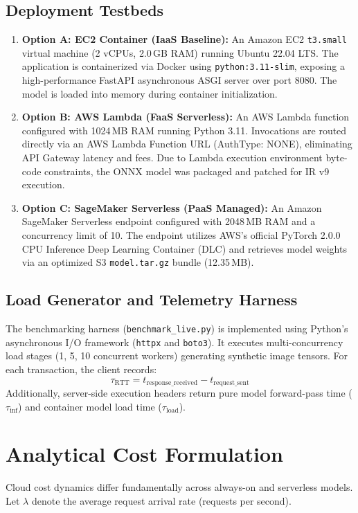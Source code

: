 \documentclass[conference]{IEEEtran}
\begin{document}
\subsection{Deployment Testbeds}
\begin{enumerate}
    \item \textbf{Option A: EC2 Container (IaaS Baseline):} An Amazon EC2 \texttt{t3.small} virtual machine (2 vCPUs, 2.0\,GB RAM) running Ubuntu 22.04 LTS. The application is containerized via Docker using \texttt{python:3.11-slim}, exposing a high-performance FastAPI asynchronous ASGI server over port 8080. The model is loaded into memory during container initialization.
    \item \textbf{Option B: AWS Lambda (FaaS Serverless):} An AWS Lambda function configured with 1024\,MB RAM running Python 3.11. Invocations are routed directly via an AWS Lambda Function URL (AuthType: NONE), eliminating API Gateway latency and fees. Due to Lambda execution environment byte-code constraints, the ONNX model was packaged and patched for IR v9 execution.
    \item \textbf{Option C: SageMaker Serverless (PaaS Managed):} An Amazon SageMaker Serverless endpoint configured with 2048\,MB RAM and a concurrency limit of 10. The endpoint utilizes AWS's official PyTorch 2.0.0 CPU Inference Deep Learning Container (DLC) and retrieves model weights via an optimized S3 \texttt{model.tar.gz} bundle (12.35\,MB).
\end{enumerate}

\subsection{Load Generator and Telemetry Harness}
The benchmarking harness (\texttt{benchmark\_live.py}) is implemented using Python's asynchronous I/O framework (\texttt{httpx} and \texttt{boto3}). It executes multi-concurrency load stages (1, 5, 10 concurrent workers) generating synthetic image tensors. For each transaction, the client records:
\begin{equation}
    \tau_{\text{RTT}} = t_{\text{response\_received}} - t_{\text{request\_sent}}
\end{equation}
Additionally, server-side execution headers return pure model forward-pass time ($\tau_{\text{inf}}$) and container model load time ($\tau_{\text{load}}$).

\section{Analytical Cost Formulation}
Cloud cost dynamics differ fundamentally across always-on and serverless models. Let $\lambda$ denote the average request arrival rate (requests per second).
\end{document}
